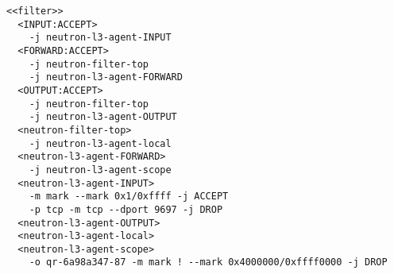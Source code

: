 \begin{lstlisting}
<<filter>>
  <INPUT:ACCEPT>
    -j neutron-l3-agent-INPUT
  <FORWARD:ACCEPT>
    -j neutron-filter-top
    -j neutron-l3-agent-FORWARD
  <OUTPUT:ACCEPT>
    -j neutron-filter-top
    -j neutron-l3-agent-OUTPUT
  <neutron-filter-top>
    -j neutron-l3-agent-local
  <neutron-l3-agent-FORWARD>
    -j neutron-l3-agent-scope
  <neutron-l3-agent-INPUT>
    -m mark --mark 0x1/0xffff -j ACCEPT
    -p tcp -m tcp --dport 9697 -j DROP
  <neutron-l3-agent-OUTPUT>
  <neutron-l3-agent-local>
  <neutron-l3-agent-scope>
    -o qr-6a98a347-87 -m mark ! --mark 0x4000000/0xffff0000 -j DROP
\end{lstlisting}
